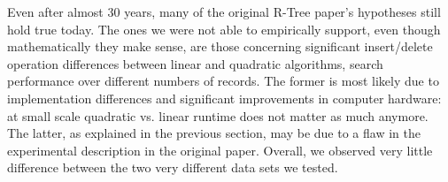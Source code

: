 Even after almost 30 years, many of the original R-Tree paper's hypotheses still hold true today. The ones we were not able to empirically support, even though mathematically they make sense, are those concerning significant insert/delete operation differences between linear and quadratic algorithms, search performance over different numbers of records. The former is most likely due to implementation differences and significant improvements in computer hardware: at small scale quadratic vs. linear runtime does not matter as much anymore. The latter, as explained in the previous section, may be due to a flaw in the experimental description in the original paper. Overall, we observed very little difference between the two very different data sets we tested.
